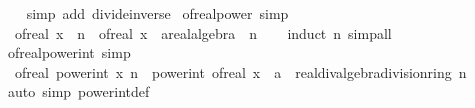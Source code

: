 \begin{isabellebody}
%
\isadelimproof
\ \ %
\endisadelimproof
%
\isatagproof
{}\isamarkupfalse%
\ {\isacharparenleft}{\kern0pt}simp\ add{\isacharcolon}{\kern0pt}\ divide{\isacharunderscore}{\kern0pt}inverse{\isacharparenright}{\kern0pt}%
\endisatagproof
{\isafoldproof}%
%
\isadelimproof
\isanewline
%
\endisadelimproof
\isanewline
{}\isamarkupfalse%
\ of{\isacharunderscore}{\kern0pt}real{\isacharunderscore}{\kern0pt}power\ {\isacharbrackleft}{\kern0pt}simp{\isacharbrackright}{\kern0pt}{\isacharcolon}{\kern0pt}\isanewline
\ \ {\isachardoublequoteopen}of{\isacharunderscore}{\kern0pt}real\ {\isacharparenleft}{\kern0pt}x\ {\isacharcircum}{\kern0pt}\ n{\isacharparenright}{\kern0pt}\ {\isacharequal}{\kern0pt}\ {\isacharparenleft}{\kern0pt}of{\isacharunderscore}{\kern0pt}real\ x\ {\isacharcolon}{\kern0pt}{\isacharcolon}{\kern0pt}\ {\isacharprime}{\kern0pt}a{\isacharcolon}{\kern0pt}{\isacharcolon}{\kern0pt}{\isacharbraceleft}{\kern0pt}real{\isacharunderscore}{\kern0pt}algebra{\isacharunderscore}{\kern0pt}{}{\isacharbraceright}{\kern0pt}{\isacharparenright}{\kern0pt}\ {\isacharcircum}{\kern0pt}\ n{\isachardoublequoteclose}\isanewline
%
\isadelimproof
\ \ %
\endisadelimproof
%
\isatagproof
{}\isamarkupfalse%
\ {\isacharparenleft}{\kern0pt}induct\ n{\isacharparenright}{\kern0pt}\ simp{\isacharunderscore}{\kern0pt}all%
\endisatagproof
{\isafoldproof}%
%
\isadelimproof
\isanewline
%
\endisadelimproof
\isanewline
{}\isamarkupfalse%
\ of{\isacharunderscore}{\kern0pt}real{\isacharunderscore}{\kern0pt}power{\isacharunderscore}{\kern0pt}int\ {\isacharbrackleft}{\kern0pt}simp{\isacharbrackright}{\kern0pt}{\isacharcolon}{\kern0pt}\isanewline
\ \ {\isachardoublequoteopen}of{\isacharunderscore}{\kern0pt}real\ {\isacharparenleft}{\kern0pt}power{\isacharunderscore}{\kern0pt}int\ x\ n{\isacharparenright}{\kern0pt}\ {\isacharequal}{\kern0pt}\ power{\isacharunderscore}{\kern0pt}int\ {\isacharparenleft}{\kern0pt}of{\isacharunderscore}{\kern0pt}real\ x\ {\isacharcolon}{\kern0pt}{\isacharcolon}{\kern0pt}\ {\isacharprime}{\kern0pt}a\ {\isacharcolon}{\kern0pt}{\isacharcolon}{\kern0pt}\ {\isacharbraceleft}{\kern0pt}real{\isacharunderscore}{\kern0pt}div{\isacharunderscore}{\kern0pt}algebra{\isacharcomma}{\kern0pt}division{\isacharunderscore}{\kern0pt}ring{\isacharbraceright}{\kern0pt}{\isacharparenright}{\kern0pt}\ n{\isachardoublequoteclose}\isanewline
%
\isadelimproof
\ \ %
\endisadelimproof
%
\isatagproof
{}\isamarkupfalse%
\ {\isacharparenleft}{\kern0pt}auto\ simp{\isacharcolon}{\kern0pt}\ power{\isacharunderscore}{\kern0pt}int{\isacharunderscore}{\kern0pt}def{\isacharparenright}{\kern0pt}%

\end{isabellebody}
